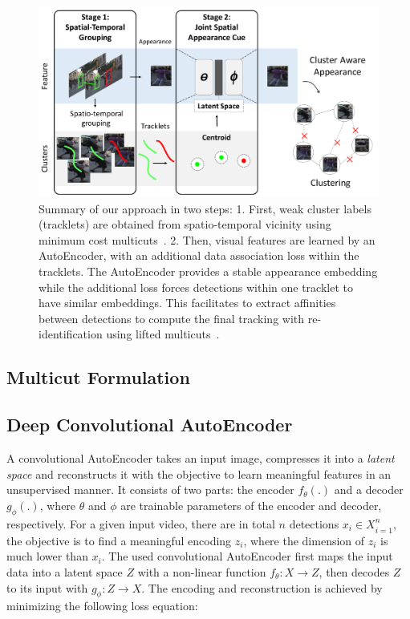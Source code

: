 \begin{figure}[t]
	\begin{center}
		\includegraphics[width=0.7\linewidth]{Fig_2_figure2.pdf}
	\end{center}
	\caption{Summary of our approach in two steps: 1. First, weak cluster labels (tracklets) are obtained from spatio-temporal vicinity using minimum cost multicuts~\cite{chopra-1993}. 2. Then, visual features are learned by an AutoEncoder, with an additional data association loss within the tracklets. The AutoEncoder provides a stable appearance embedding while the additional loss forces detections within one tracklet to have similar embeddings. This facilitates to extract affinities between detections to compute the final tracking with re-identification using lifted multicuts~\cite{tang2017multiple}.}
	\label{fig:figure0}
\vspace*{-5mm}
\end{figure}

\subsection{Multicut Formulation}
\label{subsec:multicut}



\subsection{Deep Convolutional AutoEncoder}
\label{subsec:autoencoder}
A convolutional AutoEncoder takes an input image, compresses it into a \textit{latent space} and reconstructs it with the objective to learn meaningful features in an unsupervised manner. 
It consists of two parts: the encoder $f_\theta(.)$ and a decoder $g_\phi(.)$, where $\theta$ and $\phi$ are trainable parameters of the encoder and decoder, respectively. 
For a given input video, there are in total $n$ detections ${x_i \in X}_{i=1}^n$, the objective is to find a meaningful encoding $z_i$, where the dimension of $z_i$ is much lower than $x_i$. The used convolutional AutoEncoder first maps the input data into a latent space $Z$ with a non-linear function $f_\theta: X \rightarrow Z$, then decodes $Z$ to its input with $g_\phi:Z\rightarrow X$. 
The encoding and reconstruction is achieved by minimizing the following loss equation:

